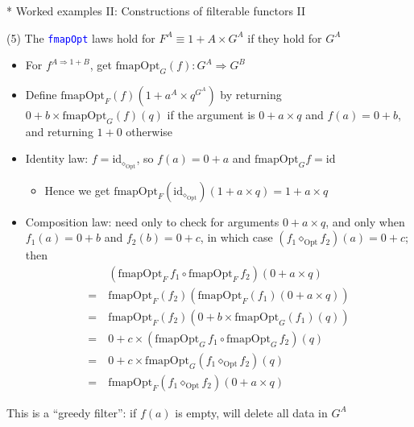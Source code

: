 \documentclass[english]{beamer}
\begin{document}
\begin{frame}{{*} Worked examples II: Constructions of filterable functors II}

(5) The \texttt{\textcolor{blue}{\footnotesize{}fmapOpt}} laws hold
for $F^{A}\equiv1+A\times G^{A}$ if they hold for $G^{A}$
\begin{itemize}
\item For $f^{A\Rightarrow1+B}$, get {\footnotesize{}$\text{fmapOpt}_{G}(f):G^{A}\Rightarrow G^{B}$}{\footnotesize \par}
\item {\footnotesize{}Define $\text{fmapOpt}_{F}(f)(1+a^{A}\times q^{G^{A}})$
by returning $0+b\times\text{fmapOpt}_{G}(f)(q)$ if the argument
is $0+a\times q$ and $f(a)=0+b$, and returning $1+0$ otherwise}{\footnotesize \par}
\item Identity law: {\footnotesize{}$f=\text{id}_{\diamond_{\text{Opt}}}$,
so $f(a)=0+a$ and $\text{fmapOpt}_{G}f=\text{id}$}{\footnotesize \par}
\begin{itemize}
\item Hence we get{\footnotesize{} $\text{fmapOpt}_{F}(\text{id}_{\diamond_{\text{Opt}}})(1+a\times q)=1+a\times q$}{\footnotesize \par}
\end{itemize}
\item Composition law: {\footnotesize{}need only to check for arguments
$0+a\times q$, and only when $f_{1}(a)=0+b$ and $f_{2}(b)=0+c$,
in which case $(f_{1}\diamond_{\text{Opt}}f_{2})(a)=0+c$; then 
\begin{align*}
 & (\text{fmapOpt}_{F}\,f_{1}\circ\text{fmapOpt}_{F}\,f_{2})(0+a\times q)\\
=\  & \text{fmapOpt}_{F}(f_{2})\left(\text{fmapOpt}_{F}(f_{1})(0+a\times q)\right)\\
=\  & \text{fmapOpt}_{F}(f_{2})\left(0+b\times\text{fmapOpt}_{G}(f_{1})(q)\right)\\
=\  & 0+c\times(\text{fmapOpt}_{G}\,f_{1}\circ\text{fmapOpt}_{G}\,f_{2})(q)\\
=\  & 0+c\times\text{fmapOpt}_{G}(f_{1}\diamond_{\text{Opt}}f_{2})(q)\\
=\  & \text{fmapOpt}_{F}(f_{1}\diamond_{\text{Opt}}f_{2})(0+a\times q)
\end{align*}
}{\footnotesize \par}
\end{itemize}
This is a ``greedy filter'': if $f(a)$ is empty, will delete all
data in $G^{A}$
\end{frame}
\end{document}
